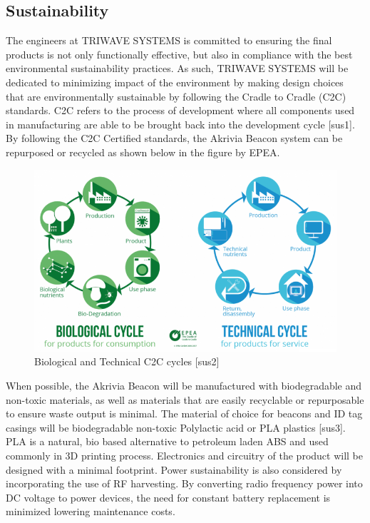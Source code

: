 \subsection{Sustainability}
\bigskip
The engineers at TRIWAVE SYSTEMS is committed to ensuring the final products is not only functionally effective, but also in compliance with the best environmental sustainability practices. As such, TRIWAVE SYSTEMS will be dedicated to minimizing impact of the environment by making design choices that are environmentally sustainable by following the Cradle to Cradle (C2C) standards. C2C refers to the process of development where all components used in manufacturing are able to be brought back into the development cycle [sus1]. By following the C2C Certified standards, the Akrivia Beacon system can be repurposed or recycled as shown below in the figure by EPEA.
\begin{figure}[H]
\centering
    \includegraphics[scale=0.85]{./images/BioTechCycle.png}
    \caption{Biological and Technical C2C cycles [sus2]}
\end{figure}

When possible, the Akrivia Beacon will be manufactured with biodegradable and non-toxic materials, as well as materials that are easily recyclable or repurposable to ensure waste output is minimal. The material of choice for beacons and ID tag casings will be biodegradable non-toxic Polylactic acid or PLA plastics [sus3]. PLA is a natural, bio based alternative to petroleum laden ABS and used commonly in 3D printing process. Electronics and circuitry of the product will be designed with a minimal footprint. Power sustainability is also considered by incorporating the use of RF harvesting. By converting radio frequency power into DC voltage to power devices, the need for constant battery replacement is minimized lowering maintenance costs. 

